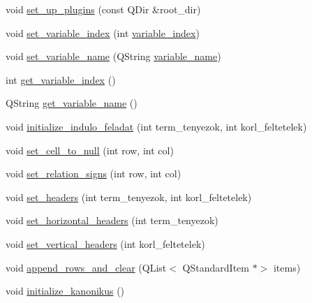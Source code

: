 \begin{DoxyCompactItemize}
\item 
void \hyperlink{classSimplex__method__calculator_a18e84030946336020d9656ac4baf96d9}{set\+\_\+up\+\_\+plugins} (const Q\+Dir \&root\+\_\+dir)
\item 
void \hyperlink{classSimplex__method__calculator_ae0549eb7fe58a527a68e78a8df8d5343}{set\+\_\+variable\+\_\+index} (int \hyperlink{classSimplex__method__calculator_a74047e24272272857106e1598c275b7c}{variable\+\_\+index})
\item 
void \hyperlink{classSimplex__method__calculator_a8b18de0aa2b1040e0e023f40b14d1655}{set\+\_\+variable\+\_\+name} (Q\+String \hyperlink{classSimplex__method__calculator_ab223955f9cf2afc3a32ff6bd13a3f5a4}{variable\+\_\+name})
\item 
int \hyperlink{classSimplex__method__calculator_a551cf0e83837a64c4757d8c090d6926f}{get\+\_\+variable\+\_\+index} ()
\item 
Q\+String \hyperlink{classSimplex__method__calculator_a192807b33ce7bb45bc724eb0542ffa33}{get\+\_\+variable\+\_\+name} ()
\item 
void \hyperlink{classSimplex__method__calculator_a9a139d8cdb7be97eff44c7143a8b915c}{initialize\+\_\+indulo\+\_\+feladat} (int term\+\_\+tenyezok, int korl\+\_\+feltetelek)
\item 
void \hyperlink{classSimplex__method__calculator_afcff0009b07937efe20f3d64ea10d550}{set\+\_\+cell\+\_\+to\+\_\+null} (int row, int col)
\item 
void \hyperlink{classSimplex__method__calculator_ae6ef812805cc9013c137cd6f833c6017}{set\+\_\+relation\+\_\+signs} (int row, int col)
\item 
void \hyperlink{classSimplex__method__calculator_a49ee6c7aaf6f7429b2d7bb3110ead22f}{set\+\_\+headers} (int term\+\_\+tenyezok, int korl\+\_\+feltetelek)
\item 
void \hyperlink{classSimplex__method__calculator_a56de11e5f19d4c81ee0554196834b54e}{set\+\_\+horizontal\+\_\+headers} (int term\+\_\+tenyezok)
\item 
void \hyperlink{classSimplex__method__calculator_a2c2f21414c20d27ac7ddb8249a2d852c}{set\+\_\+vertical\+\_\+headers} (int korl\+\_\+feltetelek)
\item 
void \hyperlink{classSimplex__method__calculator_abd739936d71ced59dd0f76c100fbad48}{append\+\_\+rows\+\_\+and\+\_\+clear} (Q\+List$<$ Q\+Standard\+Item $\ast$$>$ items)
\item 
void \hyperlink{classSimplex__method__calculator_abb2932fa0eddff8f3a3737513cad8ece}{initialize\+\_\+kanonikus} ()
$$
\end{DoxyCompactItemize}
